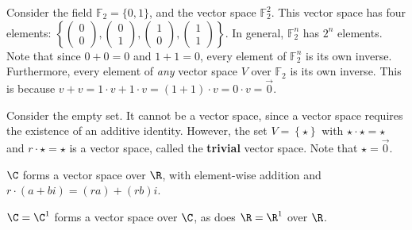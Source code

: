 \documentclass[12pt]{article}
\begin{document}
Consider the field $\mathbb{F}_2 = \{0, 1\}$, and the vector space $\mathbb{F}_2^2$. This vector space has four elements: $\left\{\begin{pmatrix}
        0 \\ 0
    \end{pmatrix}, \begin{pmatrix}
        0 \\ 1
    \end{pmatrix}, \begin{pmatrix}
        1 \\ 0
    \end{pmatrix}, \begin{pmatrix}
        1 \\ 1
    \end{pmatrix}\right\}$. In general, $\mathbb{F}_2^n$ has $2^n$ elements. Note that since $0 + 0 = 0$ and $1 + 1 = 0$, every element of $\mathbb{F}_2^n$ is its own inverse. Furthermore, every element of \textit{any} vector space $V$ over $\mathbb{F}_2$ is its own inverse. This is because $v + v = 1 \cdot v + 1 \cdot v = (1 + 1) \cdot v = 0 \cdot v = \vec{0}$.

Consider the empty set. It cannot be a vector space, since a vector space requires the existence of an additive identity. However, the set $V = \left\{\star\right\}$ with $\star \cdot \star = \star$ and $r \cdot \star = \star$ is a vector space, called the \textbf{trivial} vector space. Note that $\star = \vec{0}$.

\begin{exmp}
    $\C$ forms a vector space over $\R$, with element-wise addition and $r \cdot (a + bi) = (ra) + (rb)i$.
\end{exmp}

\begin{rmk}
    $\C =\C^1$ forms a vector space over $\C$, as does $\R = \R^1$ over $\R$.
\end{rmk}
\end{document}
